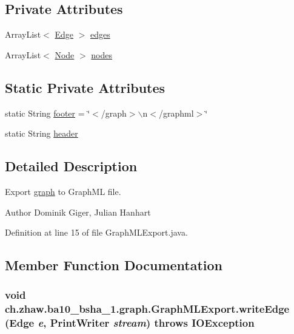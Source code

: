 \subsection*{Private Attributes}
\begin{DoxyCompactItemize}
\item 
ArrayList$<$ \hyperlink{classch_1_1zhaw_1_1ba10__bsha__1_1_1graph_1_1Edge}{Edge} $>$ \hyperlink{classch_1_1zhaw_1_1ba10__bsha__1_1_1graph_1_1GraphMLExport_ac3ec3e5c8c6aed88cf7788cc043b4537}{edges}
\item 
ArrayList$<$ \hyperlink{classch_1_1zhaw_1_1ba10__bsha__1_1_1graph_1_1Node}{Node} $>$ \hyperlink{classch_1_1zhaw_1_1ba10__bsha__1_1_1graph_1_1GraphMLExport_a72991c26d971fa9bdcce9a1e457f3894}{nodes}
\end{DoxyCompactItemize}
\subsection*{Static Private Attributes}
\begin{DoxyCompactItemize}
\item 
static String \hyperlink{classch_1_1zhaw_1_1ba10__bsha__1_1_1graph_1_1GraphMLExport_a9c60598286723614922d49364b21b500}{footer} = \char`\"{}$<$/graph$>$$\backslash$n$<$/graphml$>$\char`\"{}
\item 
static String \hyperlink{classch_1_1zhaw_1_1ba10__bsha__1_1_1graph_1_1GraphMLExport_aacda8d98c8b83e0f7cdff3bad24b8bd5}{header}
\end{DoxyCompactItemize}


\subsection{Detailed Description}
Export \hyperlink{namespacech_1_1zhaw_1_1ba10__bsha__1_1_1graph}{graph} to GraphML file.

\begin{DoxyAuthor}{Author}
Dominik Giger, Julian Hanhart 
\end{DoxyAuthor}


Definition at line 15 of file GraphMLExport.java.

\subsection{Member Function Documentation}
\hypertarget{classch_1_1zhaw_1_1ba10__bsha__1_1_1graph_1_1GraphMLExport_aafa9816a624b6f1f332dae553c543f39}{
\subsubsection[{writeEdge}]{\setlength{\rightskip}{0pt plus 5cm}void ch.zhaw.ba10\_\-bsha\_\-1.graph.GraphMLExport.writeEdge ({\bf Edge} {\em e}, \/  PrintWriter {\em stream})  throws IOException }}
\label{classch_1_1zhaw_1_1ba10__bsha__1_1_1graph_1_1GraphMLExport_aafa9816a624b6f1f332dae553c543f39}


